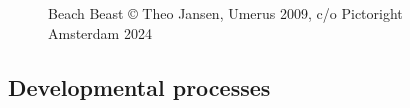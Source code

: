\documentclass[
  a4paper,
  DIV=11,
  numbers=noendperiod,
  oneside]{scrreprt}
\begin{document}
\begin{figure}


\caption{\label{fig-ch5n-img8-old-46}Beach Beast © Theo Jansen, Umerus
2009, c/o Pictoright Amsterdam 2024}

\end{figure}%

\subsection{Developmental processes}\label{sec-Developmental-processes}
\end{document}
